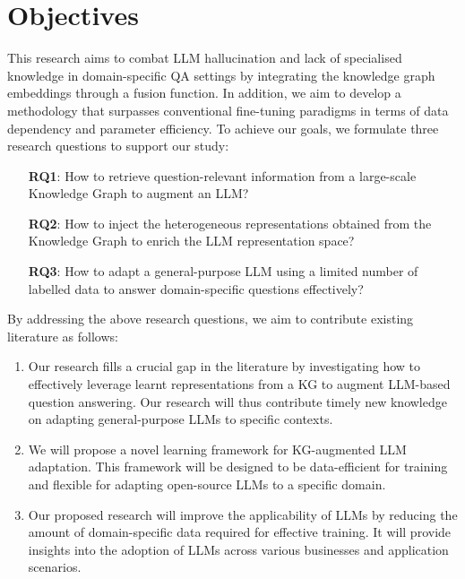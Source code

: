 \section*{Objectives}

This research aims to combat LLM hallucination and lack of specialised knowledge in domain-specific QA settings by integrating the knowledge graph embeddings through a fusion function. 
In addition, we aim to develop a methodology that surpasses conventional fine-tuning paradigms in terms of data dependency and parameter efficiency. 
To achieve our goals, we formulate three research questions to support our study: 
\vspace{-0.5cm}
\begin{itemize}
    \item[\textbf{RQ1}:] How to retrieve question-relevant information from a large-scale Knowledge Graph to augment an LLM?
    \item[\textbf{RQ2}:] How to inject the heterogeneous representations obtained from the Knowledge Graph to enrich the LLM representation space?
    \item[\textbf{RQ3}:] How to adapt a general-purpose LLM using a limited number of labelled data to answer domain-specific questions effectively?
\end{itemize}
\vspace{-0.3cm}

By addressing the above research questions, we aim to contribute existing literature as follows:\vspace{-0.3cm}
\begin{enumerate}
    \item Our research fills a crucial gap in the literature by investigating how to effectively leverage learnt representations from a KG to augment LLM-based question answering. Our research will thus contribute timely new knowledge on adapting general-purpose LLMs to specific contexts.

    \item We will propose a novel learning framework for KG-augmented LLM adaptation. This framework will be designed to be data-efficient for training and flexible for adapting open-source LLMs to a specific domain.

    \item Our proposed research will improve the applicability of LLMs by reducing the amount of domain-specific data required for effective training. It will provide insights into the adoption of LLMs across various businesses and application scenarios.
    
\end{enumerate}

